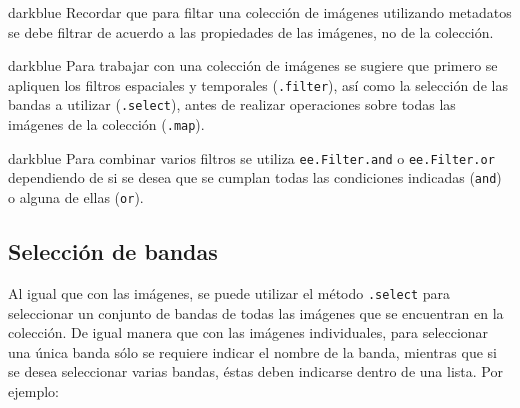\documentclass[
  12pt,
  letterpaper,
  twoside]{book}
\begin{document}
\begin{bluebox2}

\begin{awesomeblock}{5pt}{\faLightbulb}{darkblue}
Recordar que para filtar una colección de imágenes utilizando metadatos se debe filtrar de acuerdo a las propiedades de las imágenes, no de la colección.

\end{awesomeblock}

\end{bluebox2}

\begin{bluebox2}

\begin{awesomeblock}{5pt}{\faLightbulb}{darkblue}
Para trabajar con una colección de imágenes se sugiere que primero se apliquen los filtros espaciales y temporales (\texttt{.filter}), así como la selección de las bandas a utilizar (\texttt{.select}), antes de realizar operaciones sobre todas las imágenes de la colección (\texttt{.map}).

\end{awesomeblock}

\end{bluebox2}

\begin{bluebox2}

\begin{awesomeblock}{5pt}{\faLightbulb}{darkblue}
Para combinar varios filtros se utiliza \texttt{ee.Filter.and} o \texttt{ee.Filter.or} dependiendo de si se desea que se cumplan todas las condiciones indicadas (\texttt{and}) o alguna de ellas (\texttt{or}).

\end{awesomeblock}

\end{bluebox2}

\hypertarget{selecciuxf3n-de-bandas-1}{%
\subsection{Selección de bandas}\label{selecciuxf3n-de-bandas-1}}

Al igual que con las imágenes, se puede utilizar el método \texttt{.select} para seleccionar un conjunto de bandas de todas las imágenes que se encuentran en la colección. De igual manera que con las imágenes individuales, para seleccionar una única banda sólo se requiere indicar el nombre de la banda, mientras que si se desea seleccionar varias bandas, éstas deben indicarse dentro de una lista. Por ejemplo:
\end{document}
